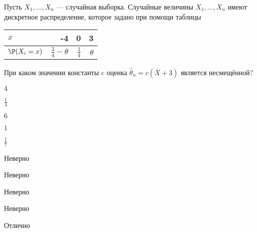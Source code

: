 
\begin{question}
Пусть \(X_1, \ldots , X_n\) --- случайная выборка. Случайные величины
\(X_1, ... , X_n\) имеют дискретное распределение, которое задано при
помощи таблицы

\begin{center}
\begin{tabular}{lrrr} \toprule
$x$  & -4 & 0 & 3 \\
\midrule
$\P(X_i=x)$ & $\frac{3}{4} - \theta$ & $\frac{1}{4}$ & $\theta$\\
\bottomrule
\end{tabular}
\end{center}

При каком значении константы \(c\) оценка
\(\hat{\theta}_n = c (\bar{X} + 3)\) является несмещённой?
\begin{answerlist}
  \item \(4\)
  \item \(\frac{1}{4}\)
  \item \(6\)
  \item \(1\)
  \item \(\frac{1}{7}\)
\end{answerlist}
\end{question}

\begin{solution}
\begin{answerlist}
  \item Неверно
  \item Неверно
  \item Неверно
  \item Неверно
  \item Отлично
\end{answerlist}
\end{solution}


